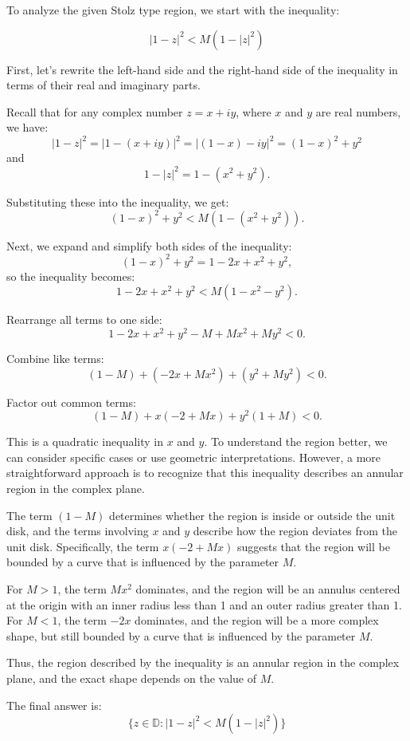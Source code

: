 To analyze the given Stolz type region, we start with the inequality:

\[
|1 - z|^2 < M(1 - |z|^2)
\]

First, let's rewrite the left-hand side and the right-hand side of the inequality in terms of their real and imaginary parts.

Recall that for any complex number \( z = x + iy \), where \( x \) and \( y \) are real numbers, we have:
\[
|1 - z|^2 = |1 - (x + iy)|^2 = |(1 - x) - iy|^2 = (1 - x)^2 + y^2
\]
and
\[
1 - |z|^2 = 1 - (x^2 + y^2).
\]

Substituting these into the inequality, we get:
\[
(1 - x)^2 + y^2 < M(1 - (x^2 + y^2)).
\]

Next, we expand and simplify both sides of the inequality:
\[
(1 - x)^2 + y^2 = 1 - 2x + x^2 + y^2,
\]
so the inequality becomes:
\[
1 - 2x + x^2 + y^2 < M(1 - x^2 - y^2).
\]

Rearrange all terms to one side:
\[
1 - 2x + x^2 + y^2 - M + Mx^2 + My^2 < 0.
\]

Combine like terms:
\[
(1 - M) + (-2x + Mx^2) + (y^2 + My^2) < 0.
\]

Factor out common terms:
\[
(1 - M) + x(-2 + Mx) + y^2(1 + M) < 0.
\]

This is a quadratic inequality in \( x \) and \( y \). To understand the region better, we can consider specific cases or use geometric interpretations. However, a more straightforward approach is to recognize that this inequality describes an annular region in the complex plane.

The term \( (1 - M) \) determines whether the region is inside or outside the unit disk, and the terms involving \( x \) and \( y \) describe how the region deviates from the unit disk. Specifically, the term \( x(-2 + Mx) \) suggests that the region will be bounded by a curve that is influenced by the parameter \( M \).

For \( M > 1 \), the term \( Mx^2 \) dominates, and the region will be an annulus centered at the origin with an inner radius less than 1 and an outer radius greater than 1. For \( M < 1 \), the term \( -2x \) dominates, and the region will be a more complex shape, but still bounded by a curve that is influenced by the parameter \( M \).

Thus, the region described by the inequality is an annular region in the complex plane, and the exact shape depends on the value of \( M \).

The final answer is:
\[
\boxed{\{ z \in \mathbb{D} : |1 - z|^2 < M(1 - |z|^2) \}}
\]